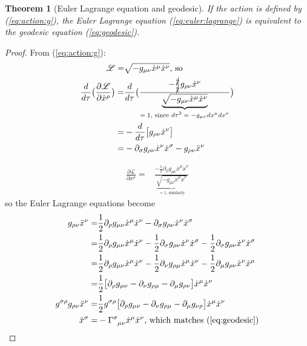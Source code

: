 \documentclass[]{article}
\newcommand{\Lagr}{\mathscr{L}}
\newtheorem{thm}{Theorem}
\begin{document}
{\begin{thm}[Euler Lagrange equation and geodesic]
	If the action is defined by (\ref{eq:action:g}), the Euler Lagrange equation (\ref{eq:euler:lagrange}) is equivalent to the geodesic equation (\ref{eq:geodesic}).
\end{thm}
\begin{proof}
	From (\ref{eq:action:g}):
	\begin{align*}
		\Lagr =& \sqrt{-g_{\mu\nu} \dot{x}^\mu \dot{x}^\nu} \text{, so}\\
		\frac{d}{d\tau}\big(\frac{\partial \Lagr}{\partial \dot{x}^\rho}\big) =& \frac{d}{d\tau} \big( \frac{-\frac{\cancel{2}}{\cancel{2}}g_{\rho\nu}  \dot{x}^\nu}{\underbrace{\sqrt{-g_{\mu\nu} \dot{x}^\mu \dot{x}^\nu}}_\text{$=1$, since $d\tau^2=-g_{\mu\nu}dx^\mu dx^\nu$}}\big)\\
		=&-\frac{d}{d\tau}\big[g_{\rho\nu}  \dot{x}^\nu\big]\\
		=&- \partial_\sigma g_{\rho\nu}  \dot{x}^\nu \dot{x}^\sigma- g_{\rho\nu} \ddot{x}^\nu 
	\end{align*}
	
	\begin{align*}
		\frac{\partial \Lagr}{\partial x^\rho}=& \frac{-\frac{1}{2}{\partial_\rho g_{\mu\nu}} \dot{x}^\mu \dot{x}^\nu}{\underbrace{\sqrt{-g_{\mu\nu} \dot{x}^\mu \dot{x}^\nu}}_\text{$=1$, similarly}} 
	\end{align*}
	so the Euler Lagrange equations become
	\begin{align*}
		 g_{\rho\nu} \ddot{x}^\nu =& \frac{1}{2} \partial_\rho g_{\mu\nu} \dot{x}^\mu \dot{x}^\nu - \partial_\sigma g_{\rho\nu}  \dot{x}^\nu \dot{x}^\sigma\\
		 =& \frac{1}{2} \partial_\rho g_{\mu\nu} \dot{x}^\mu \dot{x}^\nu - \frac{1}{2}\partial_\sigma g_{\rho\nu}  \dot{x}^\nu \dot{x}^\sigma - \frac{1}{2}\partial_\sigma g_{\rho\nu}  \dot{x}^\nu \dot{x}^\sigma\\
		 =& \frac{1}{2} \partial_\rho g_{\mu\nu} \dot{x}^\mu \dot{x}^\nu - \frac{1}{2}\partial_\nu g_{\rho\mu}  \dot{x}^\mu \dot{x}^\nu - \frac{1}{2}\partial_\mu g_{\rho\nu}  \dot{x}^\nu \dot{x}^\mu\\
		 =& \frac{1}{2} \big[ \partial_\rho g_{\mu\nu} - \partial_\nu g_{\rho\mu}  - \partial_\mu g_{\rho\nu} \big]  \dot{x}^\mu \dot{x}^\nu \\
		g^{\sigma\rho} g_{\rho\nu} \ddot{x}^\nu =&\frac{1}{2}g^{\sigma\rho} \big[ \partial_\rho g_{\mu\nu} - \partial_\nu g_{\rho\mu}  - \partial_\mu g_{\nu\rho} \big]  \dot{x}^\mu \dot{x}^\nu\\
		\ddot{x}^\sigma =& - \Gamma\indices{^\sigma_{\mu\nu}}\dot{x}^\mu \dot{x}^\nu \text{, which matches (\ref{eq:geodesic})}
	\end{align*}
\end{proof}

}
\end{document}
